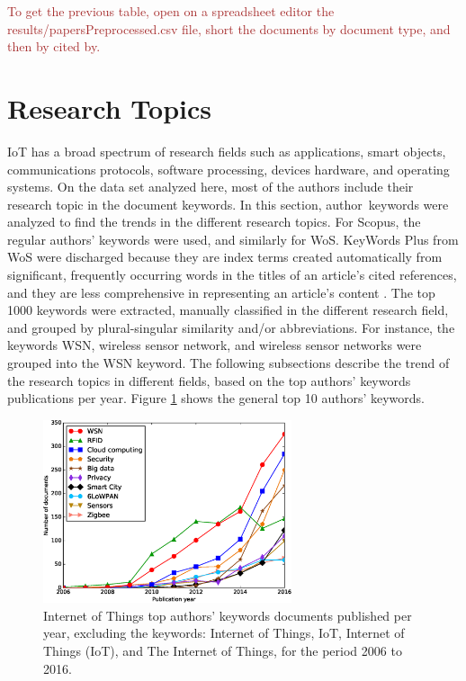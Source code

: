 \documentclass[symmetry,article,accept,moreauthors,pdftex10pt,a4paper]{mdpi}
\newcommand{\figuresWidth}{0.65\textwidth}
\begin{document}
\noindent
\textcolor{brown}{To get the previous table, open on a spreadsheet editor the results/papersPreprocessed.csv file, short the documents by document type, and then by cited by.}


\section{Research Topics}

IoT has a broad spectrum of research fields such as applications, smart objects, communications protocols, software processing, devices hardware, and operating systems. On the data set analyzed here, most of the authors include their research topic in the document keywords. In this section, author~keywords were analyzed to find the trends in the different research topics. For Scopus, the regular authors' keywords were used, and similarly for WoS. KeyWords Plus from WoS were discharged because they are index terms created automatically from significant, frequently occurring words in the titles of an article's cited references, and they are less comprehensive in representing an article's content \cite{zhang2016comparing}. The top 1000 keywords were extracted, manually classified in the different research field, and grouped by plural-singular similarity and/or abbreviations. For instance, the keywords WSN, wireless sensor network, and wireless sensor networks were grouped into the WSN keyword. The following subsections describe the trend of the research topics in different fields, based on the top authors' keywords publications per year. Figure \ref{fig_keywords} shows the general top 10 authors' keywords.

\begin{figure}[H]
	\centering
	\includegraphics[width=\figuresWidth]{./graphs/figure4.eps}
	\caption{Internet of Things top authors' keywords documents published per year, excluding the keywords: Internet of Things, IoT, Internet of Things (IoT), and The Internet of Things, for the period 2006 to 2016.}
	\label{fig_keywords}
\end{figure} 
\end{document}
